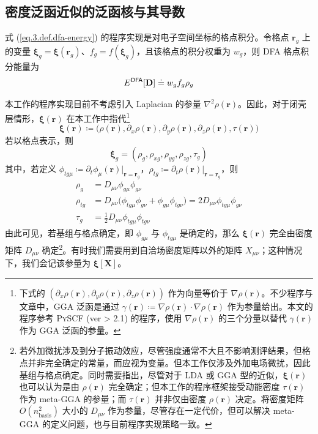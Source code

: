 \subsection{密度泛函近似的泛函核与其导数}
\label{sec.3.dft-grid}

式 (\ref{eq.3.def.dfa-energy}) 的程序实现是对电子空间坐标的格点积分。令格点 $\bm{r}_g$ 上的变量 $\bm{\xi}_g = \bm{\xi} (\bm{r}_g)$、$f_g = f(\bm{\xi}_g)$，且该格点的积分权重为 $w_g$，则 DFA 格点积分能量为
\begin{equation}
    E^{\textsf{DFA}} [\mathbf{D}] \doteq w_g f_g \rho_g
\end{equation}

本工作的程序实现目前不考虑引入 Laplacian 的参量 $\nabla^2 \rho (\bm{r})$。因此，对于闭壳层情形，$\bm{\xi} (\bm{r})$ 在本工作中指代\footnote{下式的 $(\partial_x \rho(\bm{r}), \partial_y \rho(\bm{r}), \partial_z \rho(\bm{r}))$ 作为向量等价于 $\nabla \rho(\bm{r})$。不少程序与文章中，GGA 泛函是通过 $\gamma(\bm{r}) \coloneq \nabla \rho(\bm{r}) \cdot \nabla \rho(\bm{r})$ 作为参量给出。本文的程序参考 \textsc{PySCF} (ver > 2.1) 的程序，使用 $\nabla \rho(\bm{r})$ 的三个分量以替代 $\gamma(\bm{r})$ 作为 GGA 泛函的参量。}
\begin{equation}
    \bm{\xi} (\bm{r}) \coloneq \big( \rho(\bm{r}), \partial_x \rho(\bm{r}), \partial_y \rho(\bm{r}), \partial_z \rho(\bm{r}), \tau(\bm{r}) \big)
\end{equation}
若以格点表示，则
\begin{equation}
    \label{eq.3.def.xi}
    \bm{\xi}_g = (\rho_g, \rho_{xg}, \rho_{yg}, \rho_{zg}, \tau_g)
\end{equation}
其中，若定义 $\phi_{tg\mu} \coloneq \partial_t \phi_\mu (\bm{r})|_{\bm{r} = \bm{r}_g}$，$\rho_{tg} \coloneq \partial_t \rho (\bm{r})|_{\bm{r} = \bm{r}_g}$，则
\begin{subequations}
\begin{align}
    \label{eq.3.def.rho-grid}
    \rho_g &= D_{\mu \nu} \phi_{g \mu} \phi_{g \nu} \\
    \label{eq.3.def.rho-t-grid}
    \rho_{tg} &= D_{\mu \nu} \big( \phi_{t g \mu} \phi_{g \nu} + \phi_{g \mu} \phi_{t g \nu} \big) = 2 D_{\mu \nu} \phi_{t g \mu} \phi_{g \nu} \\
    \label{eq.3.def.tau-grid}
    \tau_g &= \frac{1}{2} D_{\mu \nu} \phi_{t g \mu} \phi_{t g \nu}
\end{align}
\end{subequations}
由此可见，若基组与格点确定，即 $\phi_{g\mu}$ 与 $\phi_{tg\mu}$ 是确定的，那么 $\bm{\xi} (\bm{r})$ 完全由密度矩阵 $D_{\mu \nu}$ 确定\footnote{若外加微扰涉及到分子振动效应，尽管强度通常不大且不影响测评结果，但格点并非完全确定的常量，而应视为变量。但本工作仅涉及外加电场微扰，因此基组与格点确定。同时需要指出，尽管对于 LDA 或 GGA 型的近似，$\bm{\xi} (\bm{r})$ 也可以认为是由 $\rho(\bm{r})$ 完全确定；但本工作的程序框架接受动能密度 $\tau (\bm{r})$ 作为 meta-GGA 的参量；而 $\tau (\bm{r})$ 并非仅由密度 $\rho(\bm{r})$ 决定。将密度矩阵 $O(n_\mathrm{basis}^2)$ 大小的 $D_{\mu \nu}$ 作为参量，尽管存在一定代价，但可以解决 meta-GGA 的定义问题，也与目前程序实现策略一致。}。有时我们需要用到自洽场密度矩阵以外的矩阵 $X_{\mu \nu}$；这种情况下，我们会记该参量为 $\bm{\xi}[\mathbf{X}]$。


